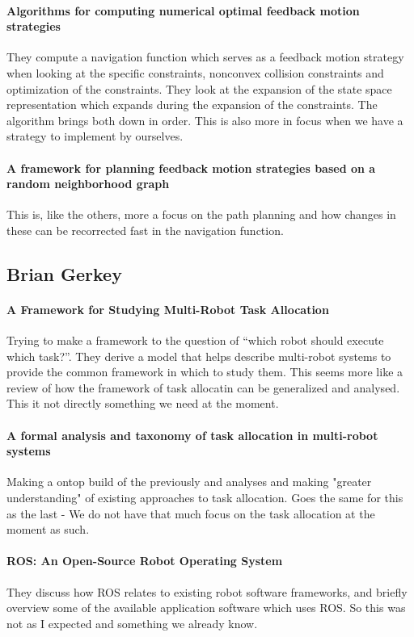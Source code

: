 \paragraph{Algorithms for computing numerical optimal feedback motion strategies}
They compute a navigation function which serves as a feedback motion strategy when looking at the specific constraints, nonconvex collision constraints and optimization of the constraints. They look at the expansion of the state space representation which expands during the expansion of the constraints. The algorithm brings both down in order.
This is also more in focus when we have a strategy to implement by ourselves.

\paragraph{A framework for planning feedback motion strategies based on a random neighborhood graph}
This is, like the others, more a focus on the path planning and how changes in these can be recorrected fast in the navigation function.


\subsection{Brian Gerkey}

\paragraph{A Framework for Studying Multi-Robot Task Allocation}
Trying to make a framework to the question of “which robot should execute which task?”. They derive a model that helps describe multi-robot systems to provide the common framework in which to study them.
This seems more like a review of how the framework of task allocatin can be generalized and analysed. This it not directly something we need at the moment.

\paragraph{A formal analysis and taxonomy of task allocation in multi-robot systems}
Making a ontop build of the previously and analyses and making "greater understanding" of existing approaches to task allocation.
Goes the same for this as the last - We do not have that much focus on the task allocation at the moment as such.

\paragraph{ROS: An Open-Source Robot Operating System}
They discuss how ROS relates to existing robot software frameworks, and briefly overview some of the available application software which uses ROS.
So this was not as I expected and something we already know.

